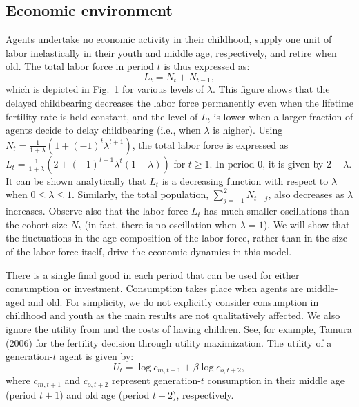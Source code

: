 \documentclass[nogrid]{MBE}%
\begin{document}
{\subsection{Economic environment}


Agents undertake no economic activity in their childhood, supply one unit of
labor inelastically in their youth and middle age, respectively, and retire
when old. The total labor force in period $t$ is thus expressed as:
\begin{equation}
L_{t}=N_{t}+N_{t-1}, \label{eq:labor}%
\end{equation}
which is depicted in Fig.~1 for various levels of $\lambda$. This figure shows that the delayed
childbearing decreases the labor force permanently even when the lifetime fertility rate is held
constant, and the level of $L_{t}$ is lower when a larger fraction of agents decide to delay
childbearing (i.e., when $\lambda$ is higher). {Using $N_{t}=\frac {1}{1+\lambda}\left( 1+\left(
-1\right)  ^{t}\lambda^{t+1}\right)  $, the total labor force is expressed as $L_{t}=
\frac{1}{1+\lambda}\left(  2+\left( -1\right)  ^{t-1}\lambda^{t}\left(  1-\lambda\right)  \right)
$ for $t\geq1$. In period 0, it is given by $2-\lambda$. It can be shown analytically that $L_{t}$
is a decreasing function with respect to $\lambda$ when $0\leq \lambda\leq1$. Similarly, the
total population, ${\textstyle\sum \nolimits_{j=-1}^{2}} N_{t-j}$, also decreases as
$\lambda$ increases.} Observe also that the labor force $L_{t}$ has much smaller oscillations than
the cohort size $N_{t}$ (in fact, there is no oscillation when $\lambda=1$). We will show that the
fluctuations in the age composition of the labor force, rather than in the size of the labor force
itself, drive the economic dynamics in this model.



There is a single final good in each period that can be used for either consumption or investment.
Consumption takes place when agents are middle-aged and old. {For simplicity, we do not explicitly
consider consumption in childhood and youth as the main results are not qualitatively affected. We
also ignore the utility from and the costs of having children. See, for example, Tamura (2006) for
the fertility decision through utility maximization.} The utility of a generation-$t$ agent is
given by:
\begin{equation}
U_{t}= \log c_{m,t+1}+\beta\log c_{o,t+2}, \label{eq:U}%
\end{equation}
where $c_{m,t+1}$ and $c_{o,t+2}$ represent generation-$t$ consumption in
their middle age (period $t+1$) and old age (period $t+2$), respectively.

}
\end{document}

